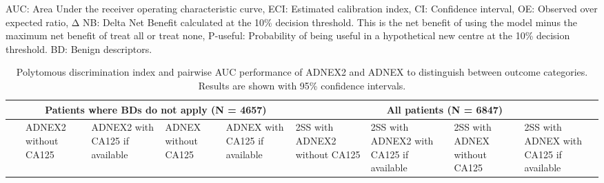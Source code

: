\begin{table}
\begin{minipage}{\textwidth}
AUC: Area Under the receiver operating characteristic curve, ECI: Estimated calibration index, CI: Confidence interval, OE: Observed over expected ratio, Δ NB: Delta Net Benefit calculated at the 10\% decision threshold. This is the net benefit of using the model minus the maximum net benefit of treat all or treat none, P-useful: Probability of being useful in a hypothetical new centre at the 10\% decision threshold. BD: Benign descriptors. 
\end{minipage}
\end{table}

\begin{table}
\centering
\small
\caption[Multiclass discrimination of ADNEX2 and ADNEX]{Polytomous discrimination index and pairwise AUC performance of ADNEX2 and ADNEX to distinguish between outcome categories. Results are shown with 95\% confidence intervals.}
\label{tab:ADNEX2:3}
    \begin{tabularx}{\textheight}{X|XXXX|XXXX}
    \toprule
        ~ & \multicolumn{4}{c}{\textbf{Patients where BDs do not apply (N = 4657)}}  & \multicolumn{4}{c}{\textbf{All patients (N = 6847)}} \\ 
        \midrule
        
        ~ & ADNEX2 without CA125 & ADNEX2 with CA125 if available & ADNEX without CA125 & ADNEX with CA125 if available & 2SS with ADNEX2 without CA125 & 2SS with ADNEX2 with CA125 if available  & 2SS with ADNEX without CA125 & 2SS with ADNEX with CA125 if available \\ 
        \midrule


\end{tabularx}
\end{table}
